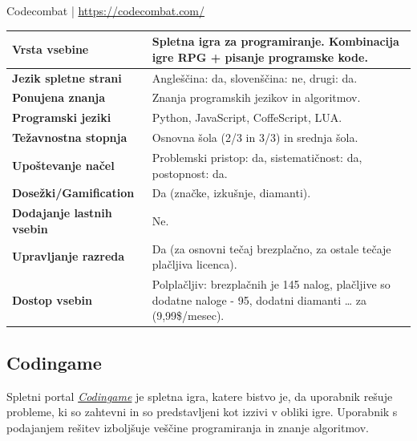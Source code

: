 \begin{osebnabox}[label={osebna:codecombat}]{Codecombat |
    \url{https://codecombat.com/}}
    \begin{tabular}{
  p{} |
  p{}  }
  \textbf{Vrsta vsebine} & Spletna igra za programiranje. Kombinacija
                           igre RPG + pisanje programske kode. \\
      \hline
  \textbf{Jezik spletne strani} & Angleščina: da, slovenščina: ne,
                                  drugi: da. \\
      \hline
  \textbf{Ponujena znanja} & Znanja programskih jezikov in  algoritmov. \\
      \hline
 \textbf{Programski jeziki} & Python, JavaScript, CoffeScript, LUA. \\  
      \hline
  \textbf{Težavnostna stopnja} & Osnovna šola (2/3 in 3/3) in srednja
                                 šola. \\ 
      \hline
   \textbf{Upoštevanje načel} & Problemski pristop: da,
                                sistematičnost: da, postopnost: da. \\
      \hline
  \textbf{Dosežki/Gamification} & Da (značke, izkušnje, diamanti). \\
      \hline
  \textbf{Dodajanje lastnih vsebin} & Ne. \\
      \hline
  \textbf{Upravljanje razreda} & Da (za osnovni tečaj brezplačno, za
                                 ostale tečaje plačljiva licenca). \\ 
      \hline
  \textbf{Dostop vsebin} & Polplačljiv: brezplačnih je 145 nalog,
                           plačljive so dodatne naloge - 95, dodatni
                           diamanti … za (9,99\$/mesec).   \\  

\end{tabular}
\end{osebnabox}

\subsection{Codingame}
\label{sec:codingame}

Spletni portal \emph{\href{https://www.codingame.com}{Codingame}}
\cite{web:codingame} je spletna igra, katere bistvo je, da uporabnik
rešuje probleme, ki so zahtevni in so predstavljeni kot izzivi v
obliki igre. Uporabnik s podajanjem rešitev izboljšuje veščine
programiranja in znanje algoritmov.

